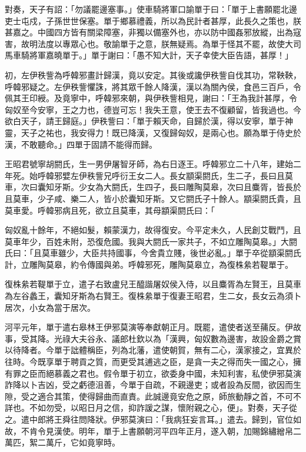 \begin{pinyinscope}
對奏，天子有詔：「勿議罷邊塞事。」使車騎將軍口諭單于曰：「單于上書願罷北邊吏士屯戍，子孫世世保塞。單于鄉慕禮義，所以為民計者甚厚，此長久之策也，朕甚嘉之。中國四方皆有關梁障塞，非獨以備塞外也，亦以防中國姦邪放縱，出為寇害，故明法度以專眾心也。敬諭單于之意，朕無疑焉。為單于怪其不罷，故使大司馬車騎將軍嘉曉單于。」單于謝曰：「愚不知大計，天子幸使大臣告語，甚厚！」

初，左伊秩訾為呼韓邪畫計歸漢，竟以安定。其後或讒伊秩訾自伐其功，常鞅鞅，呼韓邪疑之。左伊秩訾懼誅，將其眾千餘人降漢，漢以為關內侯，食邑三百戶，令佩其王印綬。及竟寧中，呼韓邪來朝，與伊秩訾相見，謝曰：「王為我計甚厚，令匈奴至今安寧，王之力也，德豈可忘！我失王意，使王去不復顧留，皆我過也。今欲白天子，請王歸庭。」伊秩訾曰：「單于賴天命，自歸於漢，得以安寧，單于神靈，天子之祐也，我安得力！既已降漢，又復歸匈奴，是兩心也。願為單于侍史於漢，不敢聽命。」四單于固請不能得而歸。

王昭君號寧胡閼氏，生一男伊屠智牙師，為右日逐王。呼韓邪立二十八年，建始二年死。始呼韓邪嬖左伊秩訾兄呼衍王女二人。長女顓渠閼氏，生二子，長曰且莫車，次曰囊知牙斯。少女為大閼氏，生四子，長曰雕陶莫皋，次曰且麋胥，皆長於且莫車，少子咸、樂二人，皆小於囊知牙斯。又它閼氏子十餘人。顓渠閼氏貴，且莫車愛。呼韓邪病且死，欲立且莫車，其母顓渠閼氏曰：「

匈奴亂十餘年，不絕如髮，賴蒙漢力，故得復安。今平定未久，人民創艾戰鬥，且莫車年少，百姓未附，恐復危國。我與大閼氏一家共子，不如立雕陶莫皋。」大閼氏曰：「且莫車雖少，大臣共持國事，今舍貴立賤，後世必亂。」單于卒從顓渠閼氏計，立雕陶莫皋，約令傳國與弟。呼韓邪死，雕陶莫皋立，為復株絫若鞮單于。

復株絫若鞮單于立，遣子右致盧兒王醯諧屠奴侯入侍，以且麋胥為左賢王，且莫車為左谷蠡王，囊知牙斯為右賢王。復株絫單于復妻王昭君，生二女，長女云為須卜居次，小女為當于居次。

河平元年，單于遣右皋林王伊邪莫演等奉獻朝正月。既罷，遣使者送至蒱反。伊故事，受其降。光祿大夫谷永、議郎杜欽以為「漢興，匈奴數為邊害，故設金爵之賞以待降者。今單于詘體稱臣，列為北藩，遣使朝賀，無有二心，漢家接之，宜異於往時。今既享單于聘貢之質，而更受其逋逃之臣，是貪一夫之得而失一國之心，擁有罪之臣而絕慕義之君也。假令單于初立，欲委身中國，未知利害，私使伊邪莫演詐降以卜吉凶，受之虧德沮善，今單于自疏，不親邊吏；或者設為反間，欲因而生隙，受之適合其策，使得歸曲而直責。此誠邊竟安危之原，師旅動靜之首，不可不詳也。不如勿受，以昭日月之信，抑詐諼之謀，懷附親之心，便」。對奏，天子從之。遣中郎將王舜往問降狀。伊邪莫演曰：「我病狂妄言耳。」遣去。歸到，官位如故，不肯令見漢使。明年，單于上書願朝河平四年正月，遂入朝，加賜錦繡繒帛二萬匹，絮二萬斤，它如竟寧時。


\end{pinyinscope}
